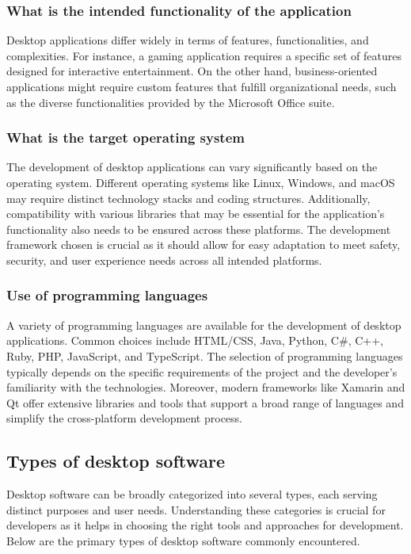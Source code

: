\subsubsection{What is the intended functionality of the application}
Desktop applications differ widely in terms of features, functionalities, and complexities. For instance, a gaming application requires a specific set of features designed for interactive entertainment. On the other hand, business-oriented applications might require custom features that fulfill organizational needs, such as the diverse functionalities provided by the Microsoft Office suite.

\subsubsection{What is the target operating system}
The development of desktop applications can vary significantly based on the operating system. Different operating systems like Linux, Windows, and macOS may require distinct technology stacks and coding structures. Additionally, compatibility with various libraries that may be essential for the application's functionality also needs to be ensured across these platforms. The development framework chosen is crucial as it should allow for easy adaptation to meet safety, security, and user experience needs across all intended platforms.

\subsubsection{Use of programming languages}
A variety of programming languages are available for the development of desktop applications. Common choices include HTML/CSS, Java, Python, C\#, C++, Ruby, PHP, JavaScript, and TypeScript. The selection of programming languages typically depends on the specific requirements of the project and the developer's familiarity with the technologies. Moreover, modern frameworks like Xamarin and Qt offer extensive libraries and tools that support a broad range of languages and simplify the cross-platform development process.

\subsection{Types of desktop software}
Desktop software can be broadly categorized into several types, each serving distinct purposes and user needs. Understanding these categories is crucial for developers as it helps in choosing the right tools and approaches for development. Below are the primary types of desktop software commonly encountered.

